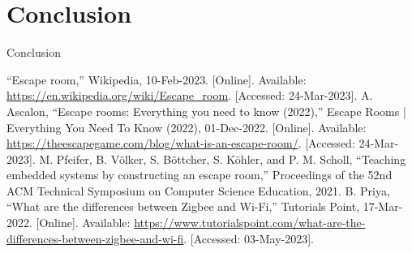 \documentclass[conference]{IEEEtran}
\begin{document}
\section{Conclusion}
Conclusion

\begin{thebibliography}{00}

     “Escape room,” Wikipedia, 10-Feb-2023. [Online]. Available: \url{https://en.wikipedia.org/wiki/Escape_room}. [Accessed: 24-Mar-2023].
     A. Ascalon, “Escape rooms: Everything you need to know (2022),” Escape Rooms | Everything You Need To Know (2022), 01-Dec-2022. [Online]. Available:  \url{https://theescapegame.com/blog/what-is-an-escape-room/}. [Accessed: 24-Mar-2023].
     M. Pfeifer, B. Völker, S. Böttcher, S. Köhler, and P. M. Scholl, “Teaching embedded systems by constructing an escape room,” Proceedings of the 52nd ACM Technical Symposium on Computer Science Education, 2021.
     B. Priya, “What are the differences between Zigbee and Wi-Fi,” Tutorials Point, 17-Mar-2022. [Online]. Available: \url{https://www.tutorialspoint.com/what-are-the-differences-between-zigbee-and-wi-fi}. [Accessed: 03-May-2023].

\end{thebibliography}
\end{document}
